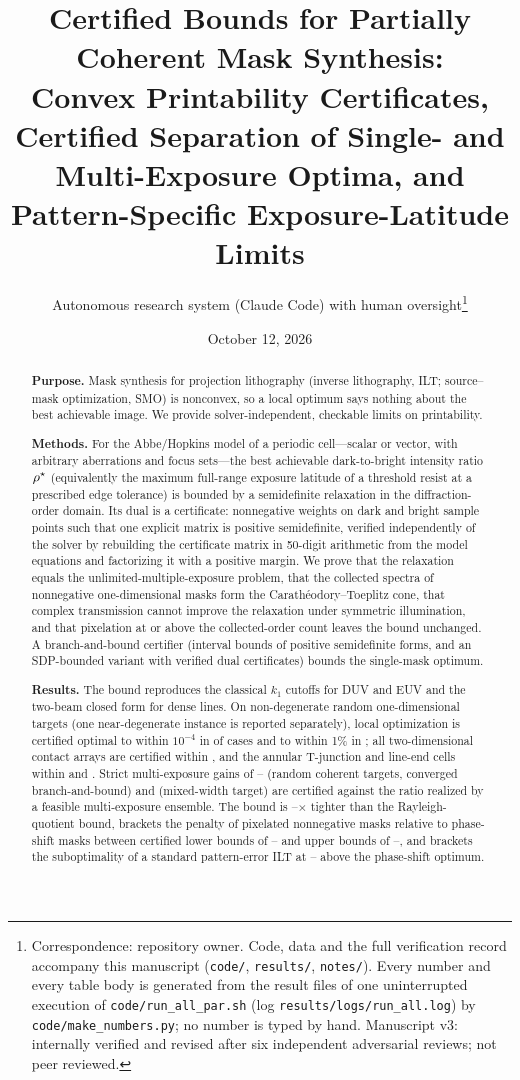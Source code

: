 \documentclass[11pt,a4paper]{article}
\title{Certified Bounds for Partially Coherent Mask Synthesis:\\ Convex Printability Certificates, Certified Separation of Single- and Multi-Exposure Optima, and Pattern-Specific Exposure-Latitude Limits}
\author{Autonomous research system (Claude Code) with human oversight\thanks{Correspondence: repository owner. Code, data and the full verification record accompany this manuscript (\texttt{code/}, \texttt{results/}, \texttt{notes/}). Every number and every table body is generated from the result files of one uninterrupted execution of \texttt{code/run\_all\_par.sh} (log \texttt{results/logs/run\_all.log}) by \texttt{code/make\_numbers.py}; no number is typed by hand. Manuscript v3: internally verified and revised after six independent adversarial reviews; not peer reviewed.}}
\date{October 12, 2026}
\theoremstyle{remark}\newtheorem*{remark}{Remark}
\begin{document}
\maketitle

\begin{abstract}
\noindent\textbf{Purpose.} Mask synthesis for projection lithography (inverse lithography, ILT; source--mask optimization, SMO) is nonconvex, so a local optimum says nothing about the best achievable image. We provide solver-independent, checkable limits on printability.

\noindent\textbf{Methods.} For the Abbe/Hopkins model of a periodic cell---scalar or vector, with arbitrary aberrations and focus sets---the best achievable dark-to-bright intensity ratio $\rho^{\star}$ (equivalently the maximum full-range exposure latitude of a threshold resist at a prescribed edge tolerance) is bounded by a semidefinite relaxation in the diffraction-order domain. Its dual is a certificate: nonnegative weights on dark and bright sample points such that one explicit matrix is positive semidefinite, verified independently of the solver by rebuilding the certificate matrix in 50-digit arithmetic from the model equations and factorizing it with a positive margin. We prove that the relaxation equals the unlimited-multiple-exposure problem, that the collected spectra of nonnegative one-dimensional masks form the Carath\'eodory--Toeplitz cone, that complex transmission cannot improve the relaxation under symmetric illumination, and that pixelation at or above the collected-order count leaves the bound unchanged. A branch-and-bound certifier (interval bounds of positive semidefinite forms, and an SDP-bounded variant with verified dual certificates) bounds the single-mask optimum.

\noindent\textbf{Results.} The bound reproduces the classical $k_1$ cutoffs for DUV and EUV and the two-beam closed form for dense lines. On \randNonDegN{} non-degenerate random one-dimensional targets (one near-degenerate instance is reported separately), local optimization is certified optimal to within $10^{-4}$ in \randExact{} of cases and to within 1\% in \randOne{}; all two-dimensional contact arrays are certified within \contactsGapMax{}, and the annular T-junction and line-end cells within \tjAnnGap{} and \leGap{}. Strict multi-exposure gains of \bnbGainLo--\bnbGainHi{} (random coherent targets, converged branch-and-bound) and \bnbMixGain{} (mixed-width target) are certified against the ratio realized by a feasible multi-exposure ensemble. The bound is \rayLo--\rayHi$\times$ tighter than the Rayleigh-quotient bound, brackets the penalty of pixelated nonnegative masks relative to phase-shift masks between certified lower bounds of \binPenLo--\binPenHi{} and upper bounds of \binPenHiLo--\binPenHiHi{}, and brackets the suboptimality of a standard pattern-error ILT at \iltPsmLo--\iltPsmHi{} above the phase-shift optimum.


\end{abstract}
\end{document}
